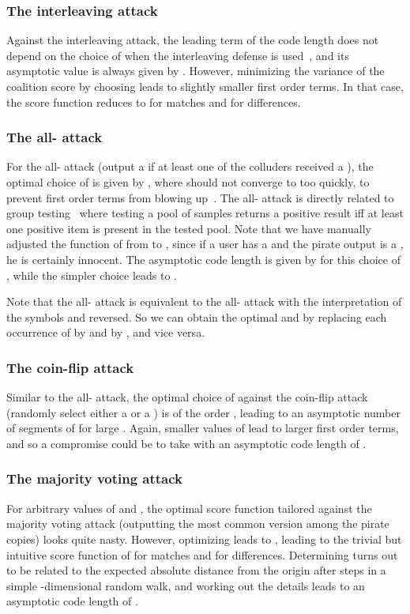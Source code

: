 \documentclass[10pt,a4paper,twocolumn]{article}
\begin{document}
\subsubsection{The interleaving attack}
Against the interleaving attack, the leading term of the code length does not depend on the choice of  when the interleaving defense is used~\cite[Proposition 10]{oosterwijk13}, and its asymptotic value is always given by . However, minimizing the variance of the coalition score by choosing  leads to slightly smaller first order terms. In that case, the score function reduces to  for matches and  for differences.

\subsubsection{The all- attack}
For the all- attack (output a  if at least one of the colluders received a ), the optimal choice of  is given by , where  should not converge to  too quickly, to prevent first order terms from blowing up~\cite{laarhoven13allerton}. The all- attack is directly related to group testing~\cite{laarhoven13allerton,meerwald11b} where testing a pool of samples returns a positive result iff at least one positive item is present in the tested pool. Note that we have manually adjusted the function of \cite{oosterwijk13} from  to , since if a user has a  and the pirate output is a , he is certainly innocent. The asymptotic code length is given by  for this choice of , while the simpler choice  leads to .

Note that the all- attack is equivalent to the all- attack with the interpretation of the symbols  and  reversed. So we can obtain the optimal  and  by replacing each occurrence of  by  and  by , and vice versa. 

\subsubsection{The coin-flip attack}
Similar to the all- attack, the optimal choice of  against the coin-flip attack (randomly select either a  or a ) is of the order , leading to an asymptotic number of segments of  for large . Again, smaller values of  lead to larger first order terms, and so a compromise could be to take  with an asymptotic code length of . 

\subsubsection{The majority voting attack}
For arbitrary values of  and , the optimal score function tailored against the majority voting attack (outputting the most common version among the pirate copies) looks quite nasty. However, optimizing  leads to , leading to the trivial but intuitive score function of  for matches and  for differences. Determining  turns out to be related to the expected absolute distance from the origin after  steps in a simple -dimensional random walk, and working out the details leads to an asymptotic code length of .
\end{document}
